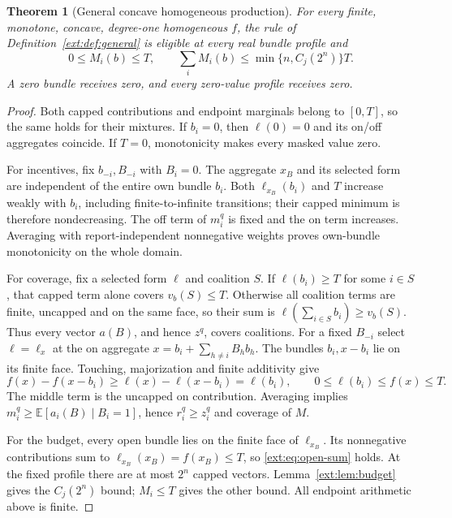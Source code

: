 \documentclass[11pt]{article}
\newtheorem{theorem}{Theorem}[section]
\theoremstyle{definition}\newtheorem{definition}[theorem]{Definition}
\theoremstyle{remark}\newtheorem{remark}[theorem]{Remark}
\newcommand{\E}{\mathbb E}
\begin{document}
\begin{theorem}[General concave homogeneous production]\label{ext:thm:general}
For every finite, monotone, concave, degree-one homogeneous $f$, the rule of
Definition~\ref{ext:def:general} is eligible at every real bundle profile and
\[
 0\le M_i(b)\le T,\qquad
 \sum_iM_i(b)\le\min\{n,C_j(2^n)\}T.
\]
A zero bundle receives zero, and every zero-value profile receives zero.
\end{theorem}
\begin{proof}
Both capped contributions and endpoint marginals belong to $[0,T]$, so the
same holds for their mixtures.  If $b_i=0$, then $\ell(0)=0$ and its on/off
aggregates coincide.  If $T=0$, monotonicity makes every masked value zero.

For incentives, fix $b_{-i},B_{-i}$ with $B_i=0$.
The aggregate $x_B$ and its selected form are independent of the entire own
bundle $b_i$.  Both $\ell_{x_B}(b_i)$ and $T$ increase weakly with $b_i$,
including finite-to-infinite transitions; their capped minimum is therefore
nondecreasing.  The off term of $m_i^q$ is fixed and the on term increases.
Averaging with report-independent nonnegative weights proves own-bundle
monotonicity on the whole domain.

For coverage, fix a selected form $\ell$ and coalition $S$.
If $\ell(b_i)\ge T$ for some $i\in S$, that capped term alone covers
$v_b(S)\le T$.  Otherwise all coalition terms are finite, uncapped and on
the same face, so their sum is $\ell(\sum_{i\in S}b_i)\ge v_b(S)$.
Thus every vector $a(B)$, and hence $z^q$, covers coalitions.
For a fixed $B_{-i}$ select $\ell=\ell_x$ at the on aggregate
$x=b_i+\sum_{h\ne i}B_hb_h$.  The bundles $b_i,x-b_i$ lie on its finite face.
Touching, majorization and finite additivity give
\begin{equation}\label{ext:eq:endpoint}
 f(x)-f(x-b_i)\ge\ell(x)-\ell(x-b_i)=\ell(b_i),\qquad
 0\le\ell(b_i)\le f(x)\le T.
\end{equation}
The middle term is the uncapped on contribution.  Averaging implies
$m_i^q\ge\E[a_i(B)\mid B_i=1]$, hence $r_i^q\ge z_i^q$ and coverage of $M$.

For the budget, every open bundle lies on the finite face of $\ell_{x_B}$.
Its nonnegative contributions sum to $\ell_{x_B}(x_B)=f(x_B)\le T$,
so \eqref{ext:eq:open-sum} holds.  At the fixed profile there are at most
$2^n$ capped vectors.  Lemma~\ref{ext:lem:budget} gives the $C_j(2^n)$ bound;
$M_i\le T$ gives the other bound.  All endpoint arithmetic above is finite.
\end{proof}
\end{document}
